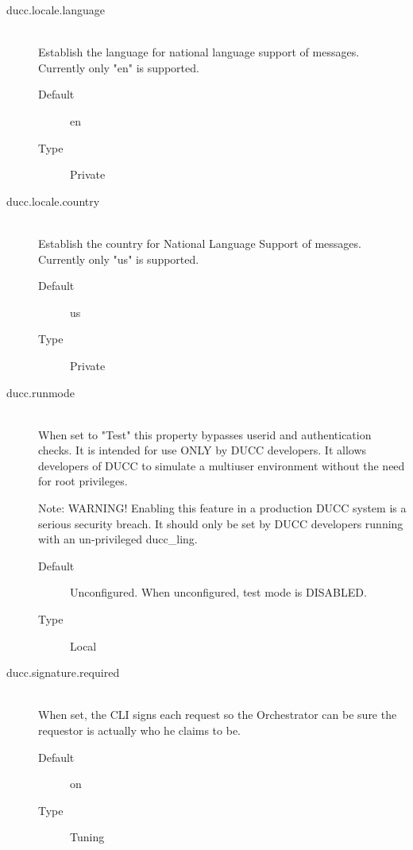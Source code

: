 \begin{description}
       \item[ducc.locale.language] \hfill \\
         Establish the language for national language support of messages. Currently only "en" is 
         supported. 
         \begin{description}
           \item[Default] en 
           \item[Type] Private 
         \end{description}
           
       \item[ducc.locale.country] \hfill \\
         Establish the country for National Language Support of messages. Currently only "us" is 
         supported. 
         \begin{description}
           \item[Default] us 
           \item[Type] Private 
         \end{description}


       \item[ducc.runmode] \hfill \\
         When set to "Test" this property bypasses userid and authentication checks. It is intended 
         for use ONLY by DUCC developers. It allows developers of DUCC to simulate a multiuser 
         environment without the need for root privileges. 
         
         Note: WARNING! Enabling this feature in a production DUCC system is a serious
         security breach. It should only be set by DUCC developers running with an un-privileged
         ducc\_ling.
         \begin{description}
           \item[Default] Unconfigured. When unconfigured, test mode is DISABLED.
           \item[Type] Local 
         \end{description}


        \item[ducc.signature.required] \hfill \\
          When set, the CLI signs each request so the Orchestrator can be sure the requestor is 
          actually who he claims to be. 
          \begin{description}            
            \item[Default] on             
            \item[Type] Tuning 
          \end{description}



\end{description}
